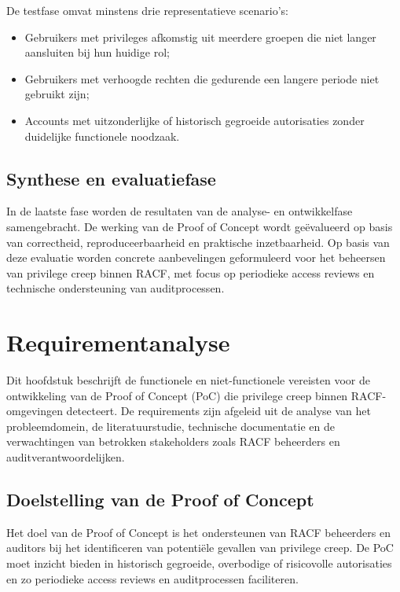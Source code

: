 De testfase omvat minstens drie representatieve scenario’s:
\begin{itemize}
	\item Gebruikers met privileges afkomstig uit meerdere groepen die niet langer aansluiten bij hun huidige rol;
	\item Gebruikers met verhoogde rechten die gedurende een langere periode niet gebruikt zijn;
	\item Accounts met uitzonderlijke of historisch gegroeide autorisaties zonder duidelijke functionele noodzaak.
\end{itemize}

\subsection{Synthese en evaluatiefase}

In de laatste fase worden de resultaten van de analyse- en ontwikkelfase samengebracht. De werking van de Proof of Concept wordt geëvalueerd op basis van correctheid, reproduceerbaarheid en praktische inzetbaarheid. Op basis van deze evaluatie worden concrete aanbevelingen geformuleerd voor het beheersen van privilege creep binnen RACF, met focus op periodieke access reviews en technische ondersteuning van auditprocessen.

\section{Requirementanalyse}
\label{sec:requirements}

Dit hoofdstuk beschrijft de functionele en niet-functionele vereisten voor de ontwikkeling van de Proof of Concept (PoC) die privilege creep binnen RACF-omgevingen detecteert. De requirements zijn afgeleid uit de analyse van het probleemdomein, de literatuurstudie, technische documentatie en de verwachtingen van betrokken stakeholders zoals RACF beheerders en auditverantwoordelijken.

\subsection{Doelstelling van de Proof of Concept}

Het doel van de Proof of Concept is het ondersteunen van RACF beheerders en auditors bij het identificeren van potentiële gevallen van privilege creep. De PoC moet inzicht bieden in historisch gegroeide, overbodige of risicovolle autorisaties en zo periodieke access reviews en auditprocessen faciliteren.

